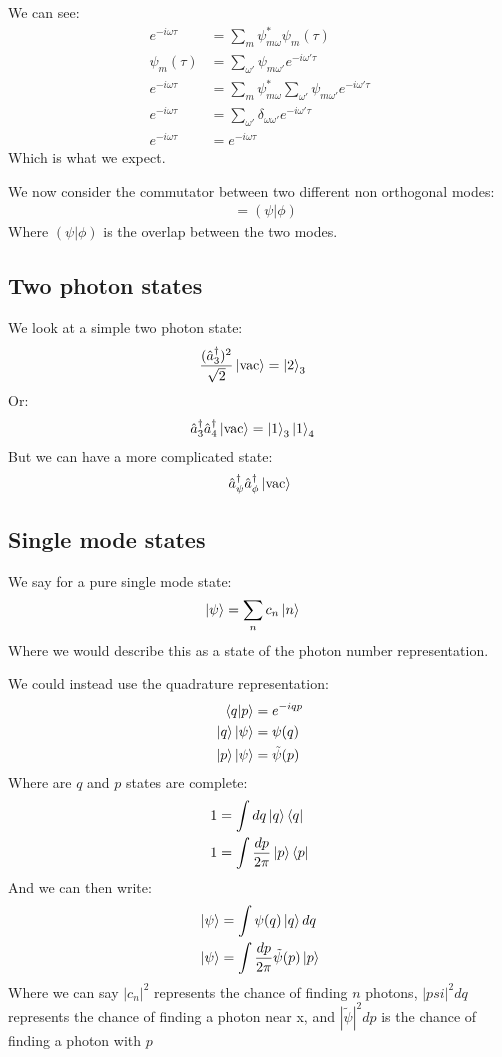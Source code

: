 We can see:
\begin{align*}
	e^{-i\omega\tau} &= \sum_m \psi_{m\omega}^* \psi_m(\tau) \\
	\psi_m(\tau) &= \sum_{\omega'} \psi_{m\omega'} e^{-i\omega'\tau} \\
	e^{-i\omega\tau} &= \sum_m \psi_{m\omega}^* \sum_{\omega'} \psi_{m\omega'} e^{-i\omega'\tau} \\
	e^{-i\omega\tau} &= \sum_{\omega'}\delta_{\omega\omega'} e^{-i\omega'\tau} \\
	e^{-i\omega\tau} &= e^{-i\omega\tau}
\end{align*}
Which is what we expect. 

We now consider the commutator between two different non orthogonal modes:
\begin{align*}
	[\hat{a}_\psi, \hat{a}^\dagger_\phi] &= (\psi|\phi)
\end{align*}
Where $(\psi|\phi)$ is the overlap between the two modes.
\subsection{Two photon states}
We look at a simple two photon state:
\begin{align*}
	\frac{(\hat{a}_3^\dagger)^2}{\sqrt{2}}\ket{\text{vac}} &= \ket{2}_3
\end{align*}
Or:
\begin{align*}
	\hat{a}_3^\dagger \hat{a}_4^\dagger \ket{\text{vac}} &= \ket{1}_3\ket{1}_4
\end{align*}
But we can have a more complicated state:
\begin{align*}
	\hat{a}_\psi^\dagger\hat{a}_\phi^\dagger\ket{\text{vac}}
\end{align*}
\subsection{Single mode states}
We say for a pure single mode state:
\begin{align*}
	\ket{\psi} &= \sum_n c_n \ket{n}
\end{align*}
Where we would describe this as a state of the photon number representation.

We could instead use the quadrature representation:
\begin{align*}
	\bra{q}\ket{p} &= e^{-iqp} \\
	\ket{q}\ket{\psi} &= \psi(q) \\
	\ket{p}\ket{\psi} &= \tilde{\psi}(p)
\end{align*}
Where are $q$ and $p$ states are complete:
\begin{align*}
	1 &= \int dq \ket{q}\bra{q} \\
	1 &= \int \frac{dp}{2\pi} \ket{p}\bra{p}
\end{align*}
And we can then write:
\begin{align*}
	\ket{\psi} &= \int \psi(q) \ket{q} dq \\
	\ket{\psi} &= \int \frac{dp}{2\pi} \tilde{\psi}(p) \ket{p}
\end{align*}
Where we can say $|c_n|^2$ represents the chance of finding $n$ photons, $|psi|^2 dq$ represents the chance of finding a photon near x, and $|\tilde{\psi}|^2 dp$ is the chance of finding a photon with $p$
